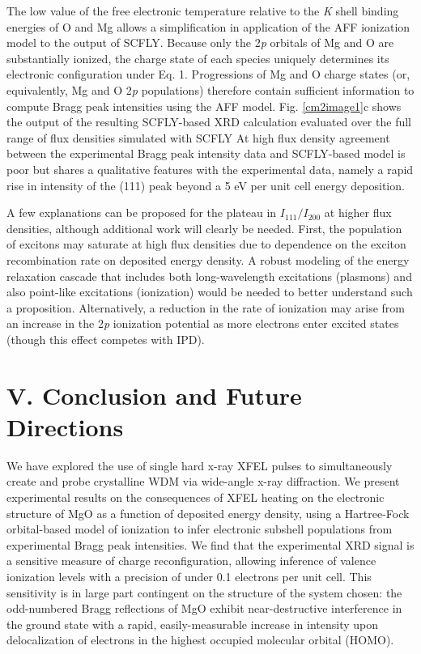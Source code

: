 The low value of the free electronic temperature relative to the
\emph{K} shell binding energies of O and Mg allows a simplification in
application of the AFF ionization model to the output of SCFLY. Because
only the 2\emph{p} orbitals of Mg and O are substantially ionized, the
charge state of each species uniquely determines its electronic
configuration under Eq. 1. Progressions of Mg and O charge states (or,
equivalently, Mg and O 2\emph{p} populations) therefore contain
sufficient information to compute Bragg peak intensities using the AFF
model. Fig. \ref{cm2image1}c shows the output of the resulting SCFLY-based XRD
calculation evaluated over the full range of flux densities simulated
with SCFLY At high flux density agreement between the experimental Bragg
peak intensity data and SCFLY-based model is poor but shares a
qualitative features with the experimental data, namely a rapid rise in
intensity of the (111) peak beyond a 5 eV per unit cell energy
deposition.

A few explanations can be proposed for the plateau in
\(I_{111}/I_{200}\) at higher flux densities, although additional work
will clearly be needed. First, the population of excitons may saturate
at high flux densities due to dependence on the exciton recombination
rate on deposited energy density. A robust modeling of the energy
relaxation cascade that includes both long-wavelength excitations
(plasmons) and also point-like excitations (ionization) would be needed
to better understand such a proposition. Alternatively, a reduction in
the rate of ionization may arise from an increase in the 2\emph{p}
ionization potential as more electrons enter excited states (though this
effect competes with IPD).

\section{V. Conclusion and Future Directions}

We have explored the use of single hard x-ray XFEL pulses to
simultaneously create and probe crystalline WDM via wide-angle x-ray
diffraction. We present experimental results on the consequences of XFEL
heating on the electronic structure of MgO as a function of deposited
energy density, using a Hartree-Fock orbital-based model of ionization
to infer electronic subshell populations from experimental Bragg peak
intensities. We find that the experimental XRD signal is a sensitive
measure of charge reconfiguration, allowing inference of valence
ionization levels with a precision of under 0.1 electrons per unit cell.
This sensitivity is in large part contingent on the structure of the
system chosen: the odd-numbered Bragg reflections of MgO exhibit
near-destructive interference in the ground state with a rapid,
easily-measurable increase in intensity upon delocalization of electrons
in the highest occupied molecular orbital (HOMO).

